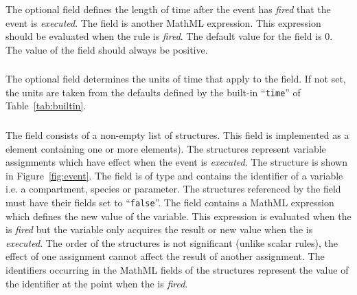 \documentclass[10pt]{cekarticle}
\newcommand{\vref}[1]{\ref{#1}}
\begin{document}
\subsubsection{}
The optional  field defines the length of time after
the event has \emph{fired} that the event is \emph{executed}. The
 field is another MathML expression.  This
expression should be evaluated when the rule is \emph{fired}.  The
default value for the  field is 0.  The value of the
 field should always be positive.

\subsubsection{}
The optional field  determines the units of time
that apply to the  field. If not set, the units are
taken from the defaults defined by the built-in ``\texttt{time}''
of Table~\vref{tab:builtin}.

\subsubsection{}
The  field consists of a non-empty list of
 structures.  This field is implemented as a
 element containing one or more
 elements).  The 
structures represent variable assignments which have effect when
the event is \emph{executed}. The  structure is
shown in Figure~\ref{fig:event}. The  field is of
type  and contains the identifier of a variable i.e. a
compartment, species or parameter.  The structures referenced by
the  field must have their 
fields set to ``\texttt{false}''.  The  field
contains a MathML expression which defines the new value of the
variable.  This expression is evaluated when the  is
\emph{fired} but the variable only acquires the result or new
value when the  is \emph{executed}.  The order of the
 structures is not significant (unlike
scalar rules), the effect of one assignment cannot affect the
result of another assignment.  The identifiers occurring in the
MathML  fields of the 
structures represent the value of the identifier at the point when
the  is \emph{fired}.
\end{document}
